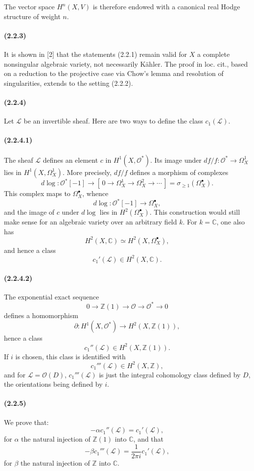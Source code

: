 \documentclass[10pt]{article}
\newcommand{\C}{\mathbb C}
\newcommand{\Z}{\mathbb Z}
\providecommand{\cO}{\mathcal O}
\providecommand{\cL}{\mathcal L}
\providecommand{\cO}{\mathcal O}
\providecommand{\cL}{\mathcal L}
\newcommand{\dlog}{d\log}
\begin{document}
The vector space $H^n(X,V)$ is therefore endowed with a canonical real Hodge structure of weight $n$.

\paragraph{(2.2.3)} It is shown in [2] that the statements (2.2.1) remain valid for $X$ a complete nonsingular algebraic variety, not necessarily Kähler. The proof in loc. cit., based on a reduction to the projective case via Chow's lemma and resolution of singularities, extends to the setting (2.2.2).

\paragraph{(2.2.4)} Let $\cL$ be an invertible sheaf. Here are two ways to define the class $c_1(\cL)$.

\paragraph{(2.2.4.1)} The sheaf $\cL$ defines an element $c$ in $H^1(X,\cO^*)$. Its image under $df/f:\cO^*\to\Omega_X^1$ lies in $H^1(X,\Omega_X^1)$. More precisely, $df/f$ defines a morphism of complexes
\[
\dlog:\cO^*[-1]\longrightarrow [\,0\to\Omega_X^1\to\Omega_X^2\to\cdots\,]=\sigma_{\ge1}(\Omega_X^\bullet).
\]
This complex maps to $\Omega_X^\bullet$, whence
\[
\dlog:\cO^*[-1]\longrightarrow\Omega_X^\bullet,
\]
and the image of $c$ under $\dlog$ lies in $H^2(\Omega_X^\bullet)$. This construction would still make sense for an algebraic variety over an arbitrary field $k$. For $k=\C$, one also has
\[
H^2(X,\C)\simeq H^2(X,\Omega_X^\bullet),
\]
and hence a class
\[
c_1'(\cL)\in H^2(X,\C).
\]

\paragraph{(2.2.4.2)} The exponential exact sequence
\[
0\to\Z(1)\to\cO\to\cO^*\to0
\]
defines a homomorphism
\[
\partial:H^1(X,\cO^*)\longrightarrow H^2(X,\Z(1)),
\]
hence a class
\[
c_1''(\cL)\in H^2(X,\Z(1)).
\]
If $i$ is chosen, this class is identified with
\[
c_1'''(\cL)\in H^2(X,\Z),
\]
and for $\cL=\cO(D)$, $c_1'''(\cL)$ is just the integral cohomology class defined by $D$, the orientations being defined by $i$.

\paragraph{(2.2.5)} We prove that:
\[
\tag{2.2.5.1}
-\alpha c_1''(\cL)=c_1'(\cL),
\]
for $\alpha$ the natural injection of $\Z(1)$ into $\C$, and that
\[
\tag{2.2.5.2}
-\beta c_1'''(\cL)=\frac{1}{2\pi i}c_1'(\cL),
\]
for $\beta$ the natural injection of $\Z$ into $\C$.
\end{document}
